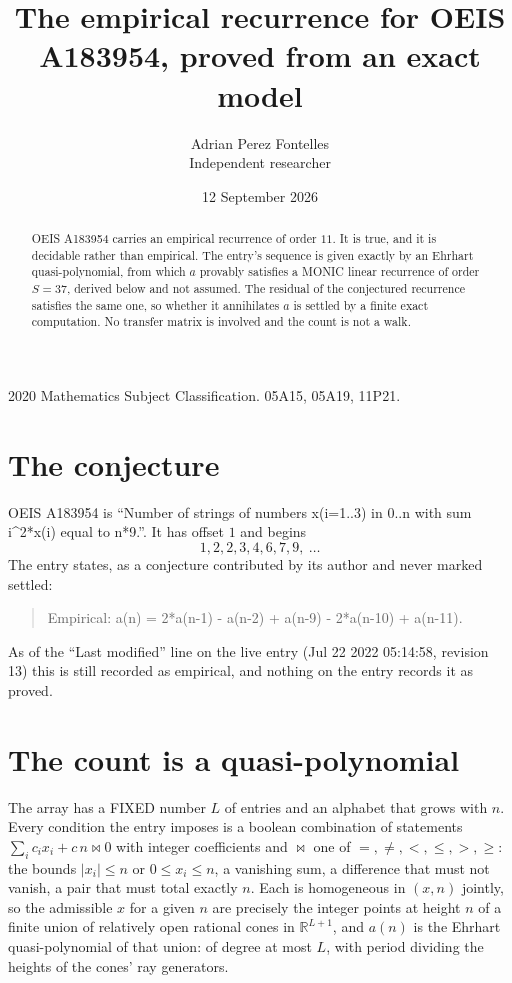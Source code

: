 \documentclass[11pt,a4paper]{article}
\title{The empirical recurrence for OEIS A183954, proved from an exact model}
\author{Adrian Perez Fontelles\\ \small Independent researcher}
\date{12 September 2026}
\theoremstyle{plain}
\theoremstyle{definition}
\begin{document}
\maketitle

\begin{abstract}
OEIS A183954 carries an empirical recurrence of order $11$. It is true, and it is
decidable rather than empirical. The entry's sequence is given exactly by an Ehrhart quasi-polynomial, from
which $a$ provably satisfies a MONIC linear recurrence of order $S=37$, derived below and not
assumed. The residual of the conjectured recurrence satisfies the same one, so whether it
annihilates $a$ is settled by a finite exact computation. No transfer matrix is involved and
the count is not a walk.
\end{abstract}

\noindent\small 2020 Mathematics Subject Classification. 05A15, 05A19, 11P21.\normalsize

\section{The conjecture}

OEIS A183954 is ``Number of strings of numbers x(i=1..3) in 0..n with sum i\^{}2*x(i) equal to n*9.''. It has offset $1$ and begins
\[
1, 2, 2, 3, 4, 6, 7, 9,\ \dots
\]
The entry states, as a conjecture contributed by its author and never marked settled:
\begin{quote}
Empirical: a(n) = 2*a(n-1) - a(n-2) + a(n-9) - 2*a(n-10) + a(n-11).
\end{quote}
As of the ``Last modified'' line on the live entry (Jul 22 2022 05:14:58, revision 13)
this is still recorded as empirical, and nothing on the entry records it as proved.

\section{The count is a quasi-polynomial}

The array has a FIXED number $L$ of entries and an alphabet that grows with $n$. Every
condition the entry imposes is a boolean combination of statements
$\sum_i c_ix_i + c\,n \bowtie 0$ with integer coefficients and $\bowtie$ one of
$=,\ne,<,\le,>,\ge$: the bounds $|x_i|\le n$ or $0\le x_i\le n$, a vanishing sum, a difference
that must not vanish, a pair that must total exactly $n$. Each is homogeneous in $(x,n)$
jointly, so the admissible $x$ for a given $n$ are precisely the integer points at height $n$
of a finite union of relatively open rational cones in $\mathbb{R}^{L+1}$, and $a(n)$ is
the Ehrhart quasi-polynomial of that union: of degree at most $L$, with period dividing the
heights of the cones' ray generators.
\end{document}
